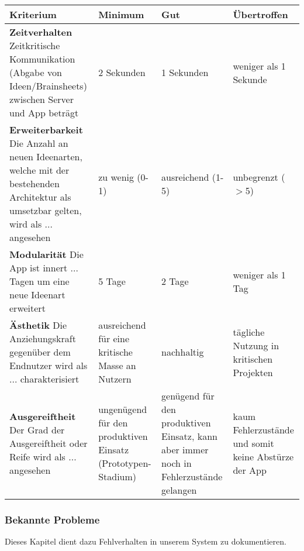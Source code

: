 \begin{center}
    \begin{tabular}{ | p{6cm} | p{2.5cm} | p{2.5cm} | p{2.5cm} |}
    	\hline
    Kriterium & Minimum & Gut & Übertroffen \\ 
    	\hline
    \textbf{Zeitverhalten} \newline Zeitkritische Kommunikation (Abgabe von Ideen/Brainsheets) zwischen Server und App beträgt & 2 Sekunden & \cellcolor{green!25} 1 Sekunden & weniger als 1 Sekunde \\
    	\hline
    \textbf{Erweiterbarkeit} \newline Die Anzahl an neuen Ideenarten, welche mit der bestehenden Architektur als umsetzbar gelten, wird als ... angesehen & zu wenig (0-1) & ausreichend (1-5) & \cellcolor{green!25} unbegrenzt ($>$5)\\
    	\hline
    \textbf{Modularität} \newline Die App ist innert ... Tagen um eine neue Ideenart erweitert & 5 Tage & \cellcolor{green!25} 2 Tage & weniger als 1 Tag \\
    	\hline
    \textbf{Ästhetik} \newline Die Anziehungskraft gegenüber dem Endnutzer wird als ... charakterisiert & ausreichend für eine kritische Masse an Nutzern & \cellcolor{green!25} nachhaltig & tägliche Nutzung in kritischen Projekten \\
    	\hline
    \textbf{Ausgereiftheit} \newline Der Grad der Ausgereiftheit oder Reife wird als ... angesehen & ungenügend für den produktiven Einsatz (Prototypen-Stadium) & \cellcolor{green!25} genügend für den produktiven Einsatz, kann aber immer noch in Fehlerzustände gelangen & kaum Fehlerzustände und somit keine Abstürze der App  \\
    	\hline
    \end{tabular}
\end{center}

\subsubsection{Bekannte Probleme}
Dieses Kapitel dient dazu Fehlverhalten in unserem System zu dokumentieren.

